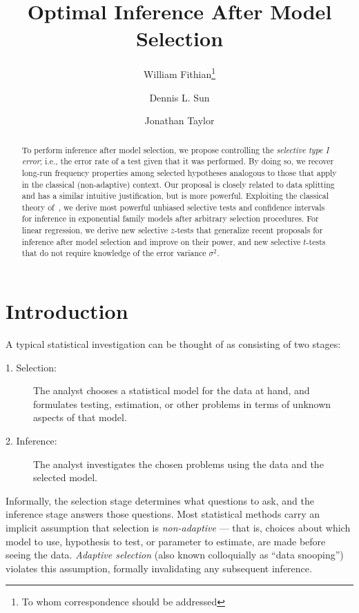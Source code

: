 \documentclass{article}
\theoremstyle{definition}
\newcommand{\sampOrData}{data }
\begin{document}
\title{Optimal Inference After Model Selection}
\author{William Fithian\footnote{To whom correspondence should be addressed}}
\author{Dennis L. Sun}
\author{Jonathan Taylor}
\maketitle


\begin{abstract}
  To perform inference after model selection, we propose controlling the {\em selective type I error}; i.e., the error rate of a test given that it was performed. By doing so, we recover long-run frequency properties among selected hypotheses analogous to those that apply in the classical (non-adaptive) context. Our proposal is closely related to \sampOrData splitting and has a similar intuitive justification, but is more powerful. Exploiting the classical theory of~\citet{lehmann1955completeness}, we derive most powerful unbiased selective tests and confidence intervals for inference in exponential family models after arbitrary selection procedures. For linear regression, we derive new selective $z$-tests that generalize recent proposals for inference after model selection and improve on their power, and new selective $t$-tests that do not require knowledge of the error variance $\sigma^2$.
\end{abstract}



\section{Introduction}\label{sec:intro}

\noindent A typical statistical investigation can be thought of as consisting of two stages:
\begin{description}
\item[1. Selection:] The analyst chooses a statistical model for the data at hand, and formulates testing, estimation, or other problems in terms of unknown aspects of that model.
\item[2. Inference:] The analyst investigates the chosen problems using the data and the selected model.
\end{description}

Informally, the selection stage determines what questions to ask, and the inference stage answers those questions. Most statistical methods carry an implicit assumption that selection is {\em non-adaptive} --- that is, choices about which model to use, hypothesis to test, or parameter to estimate, are made before seeing the data. {\em Adaptive selection} (also known colloquially as ``data snooping'') violates this assumption, formally invalidating any subsequent inference.
\end{document}
